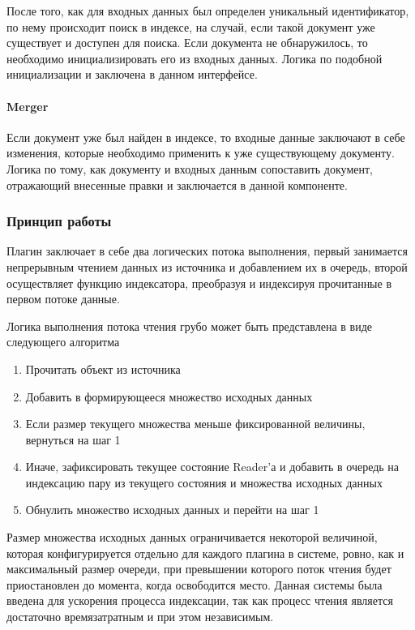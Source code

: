 После того, как для входных данных был определен уникальный идентификатор, по нему происходит поиск в индексе, на случай, если такой документ уже существует и доступен для поиска. Если документа не обнаружилось, то необходимо инициализировать его из входных данных. Логика по подобной инициализации и заключена в данном интерфейсе.

\paragraph{Merger}

Если документ уже был найден в индексе, то входные данные заключают в себе изменения, которые необходимо применить к уже существующему документу. Логика по тому, как документу и входных данным сопоставить документ, отражающий внесенные правки и заключается в данной компоненте. 

\subsubsection{Принцип работы}

Плагин заключает в себе два логических потока выполнения, первый занимается непрерывным чтением данных из источника и добавлением их в очередь, второй осуществляет функцию индексатора, преобразуя и индексируя прочитанные в первом потоке данные.

Логика выполнения потока чтения грубо может быть представлена в виде следующего алгоритма

\begin{enumerate}
	\item Прочитать объект из источника
	\item Добавить в формирующееся множество исходных данных
	\item Если размер текущего множества меньше фиксированной величины, вернуться на шаг 1
	\item Иначе, зафиксировать текущее состояние Reader'а и добавить в очередь на индексацию пару из текущего состояния и множества исходных данных
	\item Обнулить множество исходных данных и перейти на шаг 1
\end{enumerate}

Размер множества исходных данных ограничивается некоторой величиной, которая конфигурируется отдельно для каждого плагина в системе, ровно, как и максимальный размер очереди, при превышении которого поток чтения будет приостановлен до момента, когда освободится место. Данная системы была введена для ускорения процесса индексации, так как процесс чтения является достаточно времязатратным и при этом независимым.

